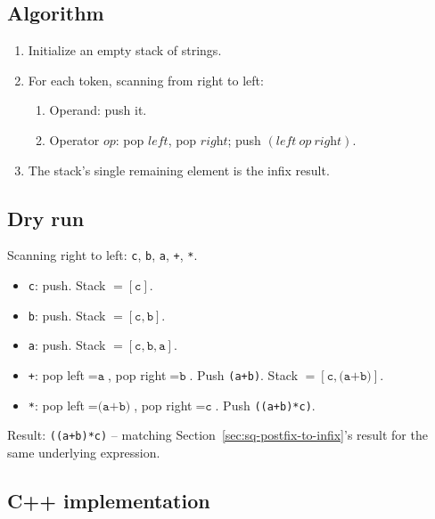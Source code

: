 \subsection*{Algorithm}

\begin{enumerate}
  \item Initialize an empty stack of strings.
  \item For each token, scanning from right to left:
  \begin{enumerate}
    \item Operand: push it.
    \item Operator $\textit{op}$: pop $\textit{left}$, pop
          $\textit{right}$; push $(\textit{left}\ \textit{op}\
          \textit{right})$.
  \end{enumerate}
  \item The stack's single remaining element is the infix result.
\end{enumerate}

\subsection*{Dry run}


Scanning right to left: \texttt{c}, \texttt{b}, \texttt{a}, \texttt{+},
\texttt{*}.

\begin{itemize}
  \item \texttt{c}: push. Stack $=[\texttt{c}]$.
  \item \texttt{b}: push. Stack $=[\texttt{c},\texttt{b}]$.
  \item \texttt{a}: push. Stack $=[\texttt{c},\texttt{b},\texttt{a}]$.
  \item \texttt{+}: pop left$=\texttt{a}$, pop right$=\texttt{b}$. Push
        \texttt{(a+b)}. Stack $=[\texttt{c},\texttt{(a+b)}]$.
  \item \texttt{*}: pop left$=\texttt{(a+b)}$, pop right$=\texttt{c}$.
        Push \texttt{((a+b)*c)}.
\end{itemize}

Result: \texttt{((a+b)*c)} -- matching
Section~\ref{sec:sq-postfix-to-infix}'s result for the same underlying
expression.

\subsection*{C++ implementation}

